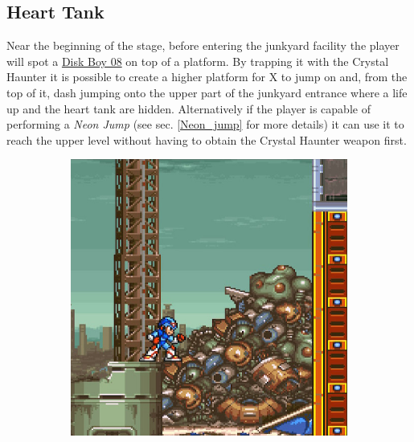 \subsection{Heart Tank}
Near the beginning of the stage, before entering the junkyard facility the player will spot a \hyperlink {enem:Disk_Boy_08}{Disk Boy 08} on top of a platform. By trapping it with the Crystal Haunter it is possible to create a higher platform for X to jump on and, from the top of it, dash jumping onto the upper part of the junkyard entrance where a life up and the heart tank are hidden. Alternatively if the player is capable of performing a \emph{Neon Jump} (see sec. \ref{Neon_jump} for more details) it can use it to reach the upper level without having to obtain the Crystal Haunter weapon first.

\begin{figure}[htp]
	\centering
	\begin{subfigure}{0.305\linewidth}
	\centering
	\includegraphics[width=\linewidth]{figures/X2/Morph_moth/Moth_heart_1.jpg}	
	\caption{}
	\end{subfigure}
	\begin{subfigure}{0.4\linewidth}
		\centering

\end{subfigure}
\end{figure}
